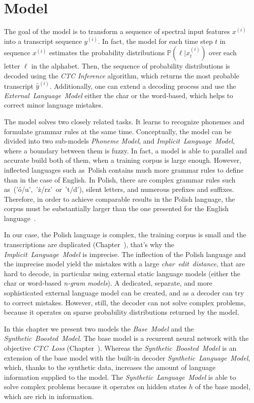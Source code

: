 
\chapter{Model}\label{ch:model}

The goal of the model is to transform a sequence of spectral input features $x^{(i)}$
into a transcript sequence $y^{(i)}$.
In fact, the model for each time step $t$ in sequence $x^{(i)}$ estimates the probability
distributions $\mathbb{P}(\ell | x^{(i)}_t)$ over each letter $\ell$ in the alphabet.
Then, the sequence of probability distributions is decoded using the \textit{CTC Inference} algorithm,
which returns the most probable transcript $\hat{y}^{(i)}$.
Additionally, one can extend a decoding process and use the \textit{External~Language~Model}
either the char or the word-based, which helps to correct minor language mistakes.

The model solves two closely related tasks.
It learns to recognize phonemes and formulate grammar rules at the same time.
Conceptually, the model can be divided into two sub-models \textit{Phoneme Model},
and \textit{Implicit~Language~Model}, where a boundary between them is fuzzy.
In fact, a model is able to parallel and accurate build both of them, when a training corpus is large enough.
However, inflected languages such as~Polish contains much more
grammar rules to define than in the case of English.
In Polish, there are complex grammar rules such as~('ó/u',~'ż/rz'~or~'t/d'), silent letters,
and numerous prefixes and suffixes.
Therefore, in order to achieve comparable results in the Polish language, the corpus must
be substantially larger than the one presented for the English language~\cite{amodei2015}.

In our case, the Polish language is complex, the training corpus is small and the transcriptions
are duplicated (Chapter~), that's why the \textit{Implicit~Language~Model} is imprecise.
The inflection of the Polish language and the imprecise model yield the mistakes with a large
\textit{char~edit~distance}, that are hard to decode, in particular using external static
language models (either the char or word-based \textit{n-gram models}).
A dedicated, separate, and more sophisticated external language model can be created,
and as a decoder can try to correct mistakes.
However, still, the decoder can not solve complex problems, because it operates on
sparse probability distributions returned by the model.

In this chapter we present two models the \textit{Base~Model} and the \textit{Synthetic~Boosted~Model}.
The base model is a recurrent neural network with the objective \textit{CTC~Loss} (Chapter~).
Whereas the \textit{Synthetic~Boosted~Model} is an extension of the base model with the built-in
decoder \textit{Synthetic~Language~Model}, which, thanks to the synthetic data, increases
the amount of language information supplied to the model.
The \textit{Synthetic~Language~Model} is able to solve complex problems because
it operates on hidden states $h$ of the base model, which are rich in information.


